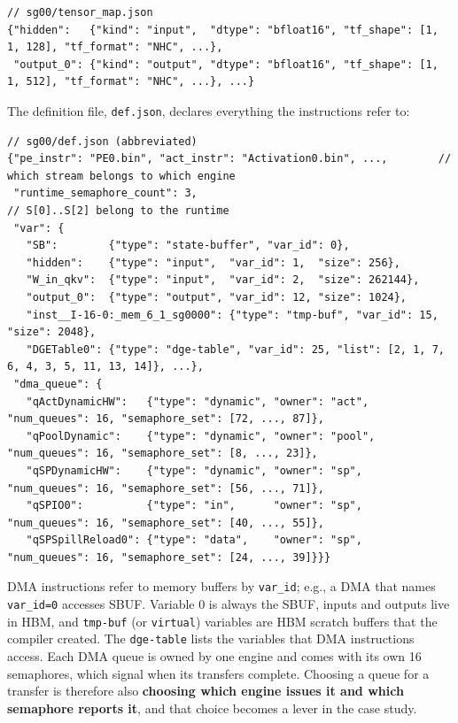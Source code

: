 \documentclass{article}
\newcommand{\code}[1]{\texttt{#1}}
\begin{document}
\begin{lstlisting}
// sg00/tensor_map.json
{"hidden":   {"kind": "input",  "dtype": "bfloat16", "tf_shape": [1, 1, 128], "tf_format": "NHC", ...},
 "output_0": {"kind": "output", "dtype": "bfloat16", "tf_shape": [1, 1, 512], "tf_format": "NHC", ...}, ...}
\end{lstlisting}

The definition file, \code{def.json}, declares everything the instructions refer to:

\begin{lstlisting}
// sg00/def.json (abbreviated)
{"pe_instr": "PE0.bin", "act_instr": "Activation0.bin", ...,        // which stream belongs to which engine
 "runtime_semaphore_count": 3,                                       // S[0]..S[2] belong to the runtime
 "var": {
   "SB":        {"type": "state-buffer", "var_id": 0},
   "hidden":    {"type": "input",  "var_id": 1,  "size": 256},
   "W_in_qkv":  {"type": "input",  "var_id": 2,  "size": 262144},
   "output_0":  {"type": "output", "var_id": 12, "size": 1024},
   "inst__I-16-0:_mem_6_1_sg0000": {"type": "tmp-buf", "var_id": 15, "size": 2048},
   "DGETable0": {"type": "dge-table", "var_id": 25, "list": [2, 1, 7, 6, 4, 3, 5, 11, 13, 14]}, ...},
 "dma_queue": {
   "qActDynamicHW":   {"type": "dynamic", "owner": "act",  "num_queues": 16, "semaphore_set": [72, ..., 87]},
   "qPoolDynamic":    {"type": "dynamic", "owner": "pool", "num_queues": 16, "semaphore_set": [8, ..., 23]},
   "qSPDynamicHW":    {"type": "dynamic", "owner": "sp",   "num_queues": 16, "semaphore_set": [56, ..., 71]},
   "qSPIO0":          {"type": "in",      "owner": "sp",   "num_queues": 16, "semaphore_set": [40, ..., 55]},
   "qSPSpillReload0": {"type": "data",    "owner": "sp",   "num_queues": 16, "semaphore_set": [24, ..., 39]}}}
\end{lstlisting}

DMA instructions refer to memory buffers by \code{var\_id}; e.g., a DMA that names \code{var\_id=0} accesses SBUF. Variable 0 is always the SBUF, inputs and outputs live in HBM, and \code{tmp-buf} (or \code{virtual}) variables are HBM scratch buffers that the compiler created. The \code{dge-table} lists the variables that DMA instructions access. Each DMA queue is owned by one engine and comes with its own 16 semaphores, which signal when its transfers complete. Choosing a queue for a transfer is therefore also \textbf{choosing which engine issues it and which semaphore reports it}, and that choice becomes a lever in the case study.
\end{document}
